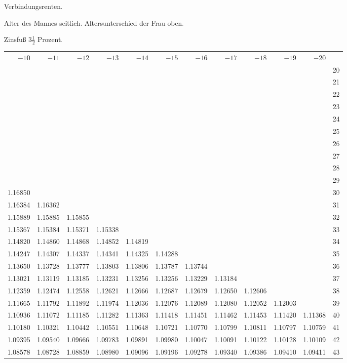 \clearpage
{}
\begin{center}
Verbindungsrenten.\par\smallskip
Alter des Mannes seitlich. Altersunterschied der Frau oben.\par\smallskip
Zinsfuß \(3\tfrac{1}{2}\) Prozent.\par\medskip
\fontsize{8}{10}\selectfont\setlength{\tabcolsep}{1.3pt}
\begin{tabular}{|rrrrrrrrrrr|r|}
\hline
\(-10\)&\(-11\)&\(-12\)&\(-13\)&\(-14\)&\(-15\)&\(-16\)&\(-17\)&\(-18\)&\(-19\)&\(-20\)&\\[8pt]
&&&&&&&&&&&20\\
&&&&&&&&&&&21\\
&&&&&&&&&&&22\\
&&&&&&&&&&&23\\
&&&&&&&&&&&24\\[5pt]
&&&&&&&&&&&25\\
&&&&&&&&&&&26\\
&&&&&&&&&&&27\\
&&&&&&&&&&&28\\
&&&&&&&&&&&29\\[5pt]
1.16850&&&&&&&&&&&30\\
1.16384&1.16362&&&&&&&&&&31\\
1.15889&1.15885&1.15855&&&&&&&&&32\\
1.15367&1.15384&1.15371&1.15338&&&&&&&&33\\
1.14820&1.14860&1.14868&1.14852&1.14819&&&&&&&34\\[5pt]
1.14247&1.14307&1.14337&1.14341&1.14325&1.14288&&&&&&35\\
1.13650&1.13728&1.13777&1.13803&1.13806&1.13787&1.13744&&&&&36\\
1.13021&1.13119&1.13185&1.13231&1.13256&1.13256&1.13229&1.13184&&&&37\\
1.12359&1.12474&1.12558&1.12621&1.12666&1.12687&1.12679&1.12650&1.12606&&&38\\
1.11665&1.11792&1.11892&1.11974&1.12036&1.12076&1.12089&1.12080&1.12052&1.12003&&39\\[5pt]
1.10936&1.11072&1.11185&1.11282&1.11363&1.11418&1.11451&1.11462&1.11453&1.11420&1.11368&40\\
1.10180&1.10321&1.10442&1.10551&1.10648&1.10721&1.10770&1.10799&1.10811&1.10797&1.10759&41\\
1.09395&1.09540&1.09666&1.09783&1.09891&1.09980&1.10047&1.10091&1.10122&1.10128&1.10109&42\\
1.08578&1.08728&1.08859&1.08980&1.09096&1.09196&1.09278&1.09340&1.09386&1.09410&1.09411&43\\

\end{tabular}
\end{center}

